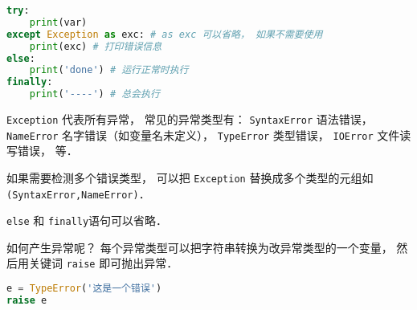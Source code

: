 
\begin{issues}
\issueDraft
\end{issues}

\begin{lstlisting}[language=python]
try:
    print(var)
except Exception as exc: # as exc 可以省略， 如果不需要使用
    print(exc) # 打印错误信息
else:
    print('done') # 运行正常时执行
finally:
    print('----') # 总会执行
\end{lstlisting}

\verb|Exception| 代表所有异常， 常见的异常类型有： \verb|SyntaxError| 语法错误， \verb|NameError| 名字错误（如变量名未定义）， \verb|TypeError| 类型错误， \verb|IOError| 文件读写错误， 等．

如果需要检测多个错误类型， 可以把 \verb|Exception| 替换成多个类型的元组如 \verb|(SyntaxError,NameError)|．

\verb|else| 和 \verb|finally|语句可以省略．

如何产生异常呢？ 每个异常类型可以把字符串转换为改异常类型的一个变量， 然后用关键词 \verb|raise| 即可抛出异常．
\begin{lstlisting}[language=python]
e = TypeError('这是一个错误')
raise e
\end{lstlisting}

